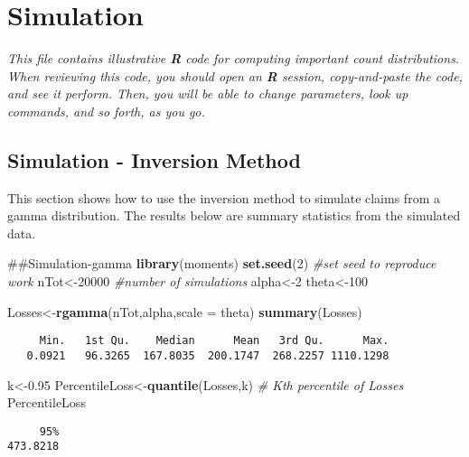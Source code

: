 \documentclass[]{book}
\newenvironment{Shaded}{\begin{snugshade}}{\end{snugshade}}
\newcommand{\KeywordTok}[1]{\textcolor[rgb]{0.13,0.29,0.53}{\textbf{#1}}}
\newcommand{\DataTypeTok}[1]{\textcolor[rgb]{0.13,0.29,0.53}{#1}}
\newcommand{\DecValTok}[1]{\textcolor[rgb]{0.00,0.00,0.81}{#1}}
\newcommand{\FloatTok}[1]{\textcolor[rgb]{0.00,0.00,0.81}{#1}}
\newcommand{\CommentTok}[1]{\textcolor[rgb]{0.56,0.35,0.01}{\textit{#1}}}
\newcommand{\NormalTok}[1]{#1}
\theoremstyle{definition}
\theoremstyle{definition}
\theoremstyle{definition}
\theoremstyle{remark}
\begin{document}
\chapter{Simulation}\label{simulation}

\emph{This file contains illustrative \textbf{R} code for computing
important count distributions. When reviewing this code, you should open
an \textbf{R} session, copy-and-paste the code, and see it perform.
Then, you will be able to change parameters, look up commands, and so
forth, as you go. }

\section{Simulation - Inversion
Method}\label{simulation---inversion-method}

This section shows how to use the inversion method to simulate claims
from a gamma distribution. The results below are summary statistics from
the simulated data.

\begin{Shaded}
\begin{Highlighting}[]
\NormalTok{##Simulation-gamma}
\KeywordTok{library}\NormalTok{(moments)}
\KeywordTok{set.seed}\NormalTok{(}\DecValTok{2}\NormalTok{) }\CommentTok{#set seed to reproduce work }
\NormalTok{nTot<-}\DecValTok{20000}  \CommentTok{#number of simulations}
\NormalTok{alpha<-}\DecValTok{2}
\NormalTok{theta<-}\DecValTok{100}
         
\NormalTok{Losses<-}\KeywordTok{rgamma}\NormalTok{(nTot,alpha,}\DataTypeTok{scale =}\NormalTok{ theta)  }
\KeywordTok{summary}\NormalTok{(Losses)}
\end{Highlighting}
\end{Shaded}

\begin{verbatim}
     Min.   1st Qu.    Median      Mean   3rd Qu.      Max. 
   0.0921   96.3265  167.8035  200.1747  268.2257 1110.1298 
\end{verbatim}

\begin{Shaded}
\begin{Highlighting}[]
\NormalTok{k<-}\FloatTok{0.95}
\NormalTok{PercentileLoss<-}\KeywordTok{quantile}\NormalTok{(Losses,k)     }\CommentTok{# Kth percentile of Losses }
\NormalTok{PercentileLoss}
\end{Highlighting}
\end{Shaded}

\begin{verbatim}
     95% 
473.8218 
\end{verbatim}
\end{document}
